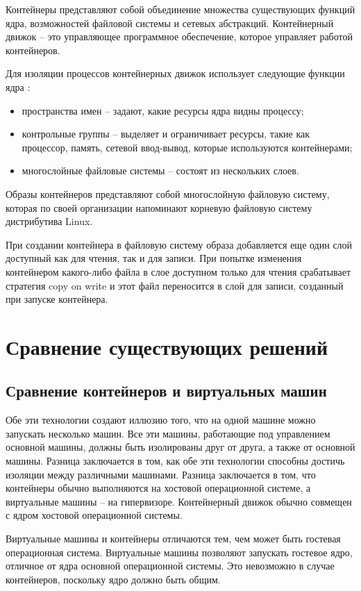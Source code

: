 Контейнеры представляют собой объединение множества существующих функций ядра, возможностей файловой системы и сетевых абстракций.
Контейнерный движок -- это управляющее программное обеспечение, которое управляет работой контейнеров.

Для изоляции процессов контейнерных движок использует следующие функции ядра \cite{jain2020linux}:
\begin{itemize}
	\item пространства имен -- задают, какие ресурсы ядра видны процессу;
	\item контрольные группы -- выделяет и ограничивает ресурсы, такие как процессор, память, сетевой ввод‑вывод, которые используются контейнерами;
	\item многослойные файловые системы -- состоят из нескольких слоев.
\end{itemize}

Образы контейнеров представляют собой многослойную файловую систему,
которая по своей организации напоминают корневую файловую систему дистрибутива Linux.

При создании контейнера в файловую систему образа добавляется еще один слой доступный как для чтения, так и для записи.
При попытке изменения контейнером какого-либо файла в слое доступном только для чтения срабатывает стратегия copy on write и этот файл переносится в слой для записи, созданный при запуске контейнера.

\chapter{Сравнение существующих решений}

\section{Сравнение контейнеров и виртуальных машин}

Обе эти технологии создают иллюзию того, что на одной машине можно запускать несколько машин. 
Все эти машины, работающие под управлением основной машины, должны быть изолированы друг от друга, а также от основной машины.
Разница заключается в том, как обе эти технологии способны достичь изоляции между различными машинами. 
Разница заключается в том, что контейнеры обычно выполняются на хостовой операционной системе, а виртуальные машины -- на гипервизоре.
Контейнерный движок обычно совмещен с ядром хостовой операционной системы.

Виртуальные машины и контейнеры отличаются тем, чем может быть гостевая операционная система.
Виртуальные машины позволяют запускать гостевое ядро, отличное от ядра основной операционной системы.
Это невозможно в случае контейнеров, поскольку ядро должно быть общим.


